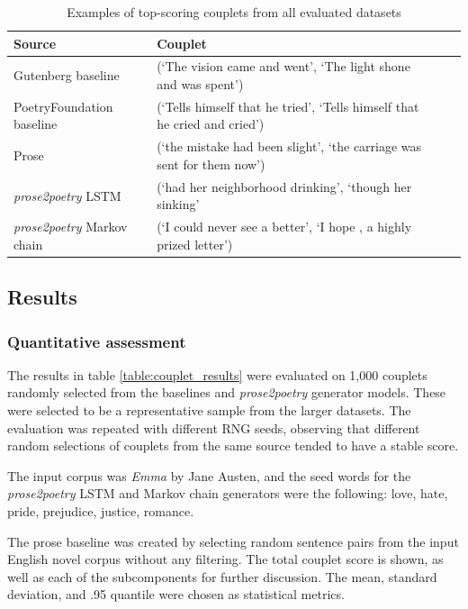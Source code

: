 \documentclass[11pt,a4paper]{article}
\begin{document}
\begin{table}[ht]
\begin{tabular*}{\textwidth}{ll cc}
	\hline\hline
	Source & Couplet \\ [0.5ex]
	\hline\hline
	Gutenberg baseline & (`The vision came and went', `The light shone and was spent') \\ [0.5ex]
	\hline
	PoetryFoundation baseline & (`Tells himself that he tried', `Tells himself that he cried and cried') \\ [0.5ex]
	\hline
	Prose & (`the mistake had been slight', `the carriage was sent for them now') \\ [0.5ex]
	\hline
	\textit{prose2poetry} LSTM & (`had her neighborhood drinking', `though her sinking' \\ [0.5ex]
	\hline
	\textit{prose2poetry} Markov chain & (`I could never see a better', `I hope , a highly prized letter') \\ [0.5ex]
	\hline
\end{tabular*}
\caption{Examples of top-scoring couplets from all evaluated datasets}
\label{table:bestcouplets}
\end{table}

\subsection{Results}
\label{sec:results}

\subsubsection{Quantitative assessment}

The results in table \ref{table:couplet_results} were evaluated on 1,000 couplets randomly selected from the baselines and \textit{prose2poetry} generator models. These were selected to be a representative sample from the larger datasets. The evaluation was repeated with different RNG seeds, observing that different random selections of couplets from the same source tended to have a stable score.

The input corpus was \textit{Emma} by Jane Austen, and the seed words for the \textit{prose2poetry} LSTM and Markov chain generators were the following: love, hate, pride, prejudice, justice, romance.

The prose baseline was created by selecting random sentence pairs from the input English novel corpus without any filtering. The total couplet score is shown, as well as each of the subcomponents for further discussion. The mean, standard deviation, and .95 quantile were chosen as statistical metrics.
\end{document}
